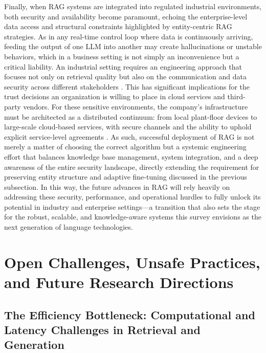 \documentclass[11pt]{article}
\begin{document}
Finally, when RAG systems are integrated into regulated industrial environments, both security and availability become paramount, echoing the enterprise-level data access and structural constraints highlighted by entity-centric RAG strategies. As in any real-time control loop where data is continuously arriving, feeding the output of one LLM into another may create hallucinations or unstable behaviors, which in a business setting is not simply an inconvenience but a critical liability. An industrial setting requires an engineering approach that focuses not only on retrieval quality but also on the communication and data security across different stakeholders \cite{ref225}. This has significant implications for the trust decisions an organization is willing to place in cloud services and third-party vendors. For these sensitive environments, the company's infrastructure must be architected as a distributed continuum: from local plant-floor devices to large-scale cloud-based services, with secure channels and the ability to uphold explicit service-level agreements \cite{ref225}. As such, successful deployment of RAG is not merely a matter of choosing the correct algorithm but a systemic engineering effort that balances knowledge base management, system integration, and a deep awareness of the entire security landscape, directly extending the requirement for preserving entity structure and adaptive fine-tuning discussed in the previous subsection. In this way, the future advances in RAG will rely heavily on addressing these security, performance, and operational hurdles to fully unlock its potential in industry and enterprise settings---a transition that also sets the stage for the robust, scalable, and knowledge-aware systems this survey envisions as the next generation of language technologies.

\section{Open Challenges, Unsafe Practices, and Future Research Directions}

\subsection{The Efficiency Bottleneck: Computational and Latency Challenges in Retrieval and Generation}
\end{document}
